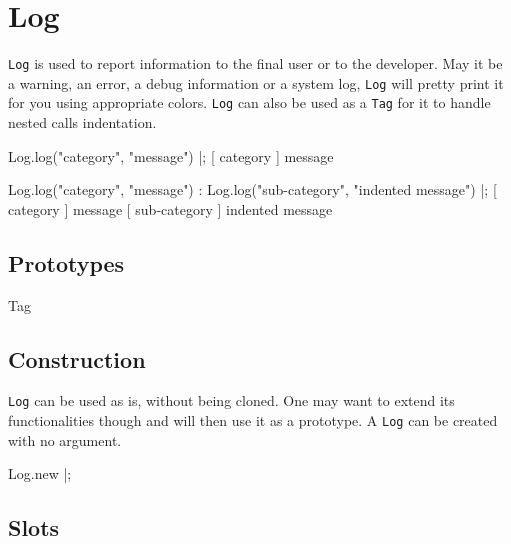 
\section{Log}

\lstinline|Log| is used to report information to the final user or to
the developer. May it be a warning, an error, a debug information or
a system log, \lstinline|Log| will pretty print it for you using
appropriate colors. \lstinline|Log| can also be used as a
\lstinline|Tag| for it to handle nested calls indentation.

\begin{urbiscript}
Log.log("category", "message") |;
[       category        ] message

Log.log("category", "message") :
{
  Log.log("sub-category", "indented message")
} |;
[       category        ] message
[      sub-category      ]   indented message
\end{urbiscript}

\subsection{Prototypes}
\begin{refObjects}
\item[Tag]
\end{refObjects}

\subsection{Construction}

\lstinline|Log| can be used as is, without being cloned. One may want
to extend its functionalities though and will then use it as a
prototype. A \lstinline|Log| can be created with no argument.

\begin{urbiscript}
Log.new |;
\end{urbiscript}

\subsection{Slots}

